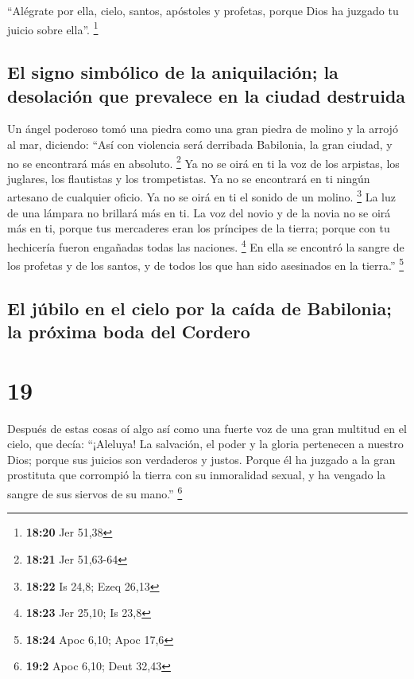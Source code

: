  ``Alégrate por ella, cielo, santos, apóstoles y
profetas, porque Dios ha juzgado tu juicio sobre ella''. \footnote{\textbf{18:20}
  Jer 51,38}

\hypertarget{el-signo-simbuxf3lico-de-la-aniquilaciuxf3n-la-desolaciuxf3n-que-prevalece-en-la-ciudad-destruida}{%
\subsection{El signo simbólico de la aniquilación; la desolación que
prevalece en la ciudad
destruida}\label{el-signo-simbuxf3lico-de-la-aniquilaciuxf3n-la-desolaciuxf3n-que-prevalece-en-la-ciudad-destruida}}

 Un ángel poderoso tomó una piedra como una gran piedra
de molino y la arrojó al mar, diciendo: ``Así con violencia será
derribada Babilonia, la gran ciudad, y no se encontrará más en absoluto.
\footnote{\textbf{18:21} Jer 51,63-64}  Ya no se oirá en
ti la voz de los arpistas, los juglares, los flautistas y los
trompetistas. Ya no se encontrará en ti ningún artesano de cualquier
oficio. Ya no se oirá en ti el sonido de un molino. \footnote{\textbf{18:22}
  Is 24,8; Ezeq 26,13}  La luz de una lámpara no brillará
más en ti. La voz del novio y de la novia no se oirá más en ti, porque
tus mercaderes eran los príncipes de la tierra; porque con tu hechicería
fueron engañadas todas las naciones. \footnote{\textbf{18:23} Jer 25,10;
  Is 23,8}  En ella se encontró la sangre de los profetas
y de los santos, y de todos los que han sido asesinados en la tierra.''
\footnote{\textbf{18:24} Apoc 6,10; Apoc 17,6}

\hypertarget{el-juxfabilo-en-el-cielo-por-la-cauxedda-de-babilonia-la-pruxf3xima-boda-del-cordero}{%
\subsection{El júbilo en el cielo por la caída de Babilonia; la próxima
boda del
Cordero}\label{el-juxfabilo-en-el-cielo-por-la-cauxedda-de-babilonia-la-pruxf3xima-boda-del-cordero}}

\hypertarget{section-18}{%
\section{19}\label{section-18}}

 Después de estas cosas oí algo así como una fuerte voz de
una gran multitud en el cielo, que decía: ``¡Aleluya! La salvación, el
poder y la gloria pertenecen a nuestro Dios;  porque sus
juicios son verdaderos y justos. Porque él ha juzgado a la gran
prostituta que corrompió la tierra con su inmoralidad sexual, y ha
vengado la sangre de sus siervos de su mano.'' \footnote{\textbf{19:2}
  Apoc 6,10; Deut 32,43}

